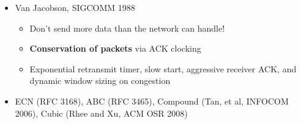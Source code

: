 \begin{frame}
\begin{columns}[T]
\begin{itemize}
	\pause

	\item Van Jacobson, SIGCOMM 1988
	\begin{itemize}
	  \item Don't send more data than the network can handle!

	  \pause

	  \item \textbf{Conservation of packets} via ACK clocking

	  \pause

	  \item Exponential retransmit timer, slow start, aggressive receiver
	    ACK, and dynamic window sizing on congestion
        \end{itemize}

	\pause

        \item ECN (RFC 3168), ABC (RFC 3465), Compound (Tan, et al, INFOCOM
	  2006), Cubic (Rhee and Xu, ACM OSR 2008)
      \end{itemize}
  \end{columns}
\end{frame}

